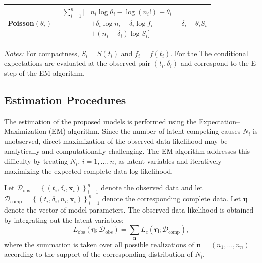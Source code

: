 \begin{table}[htb]
{\begin{tabular}{c|c|c}
        Poisson$(\theta_i)$
        &
        $\displaystyle
        \begin{aligned}
        \sum_{i=1}^n
        \Big[
        &n_i\log\theta_i
        -\log(n_i!)
        -\theta_i\\
        &+\delta_i\log n_i
        +\delta_i\log f_i\\
        &+(n_i-\delta_i)\log S_i
        \Big]
        \end{aligned}
        $
        &
        $\displaystyle
        \delta_i + \theta_i S_i
        $
        \\[8mm]

        \hline
    \end{tabular}%
    }

    \vspace{2mm}

    \begin{minipage}{0.95\textwidth}
    \footnotesize
    \textit{Notes:}
    For compactness, $S_i=S(t_i)$ and $f_i=f(t_i)$. For the
    The conditional expectations are evaluated at the observed pair
    $(t_i,\delta_i)$ and correspond to the E-step of the EM algorithm.
    \end{minipage}

\end{table}

\subsection{Estimation Procedures}

The estimation of the proposed models is performed using the
Expectation--Maximization (EM) algorithm. Since the number of latent
competing causes $N_i$ is unobserved, direct maximization of the
observed-data likelihood may be analytically and computationally
challenging. The EM algorithm addresses this difficulty by treating
$N_i$, $i=1,\ldots,n$, as latent variables and iteratively maximizing
the expected complete-data log-likelihood.

Let $\mathcal{D}_{\mathrm{obs}} = \left\{ (t_i,\delta_i,\mathbf{x}_i) \right\}^{n}_{i=1}$
denote the observed data and let $\mathcal{D}_{\mathrm{comp}} = \left\{ (t_i,\delta_i,n_i,\mathbf{x}_i) \right\}^{n}_{i=1}$
denote the corresponding complete data. Let
$\boldsymbol{\eta}$ denote the vector of model parameters. The
observed-data likelihood is obtained by integrating out the latent
variables:
\begin{equation}
L_{\mathrm{obs}}
\left(
\boldsymbol{\eta};
\mathcal{D}_{\mathrm{obs}}
\right)
=
\sum_{\boldsymbol{n}}
L_c
\left(
\boldsymbol{\eta};
\mathcal{D}_{\mathrm{comp}}
\right),
\end{equation}
where the summation is taken over all possible realizations of
$\boldsymbol{n}=(n_1,\ldots,n_n)$ according to the support of the
corresponding distribution of $N_i$.

